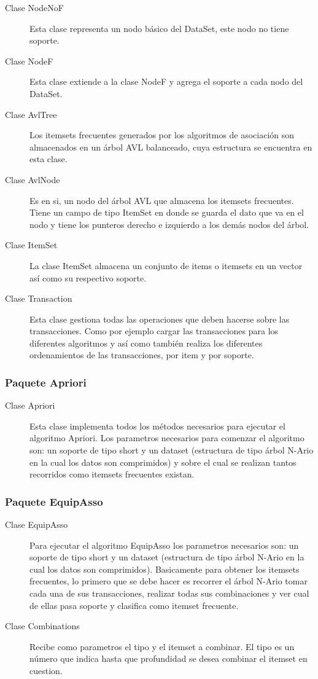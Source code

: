 \begin{description}
\item [Clase NodeNoF] Esta clase representa un nodo b\'asico del DataSet, este nodo no tiene soporte.
\item [Clase NodeF] Esta clase extiende a la clase NodeF y agrega el soporte a cada nodo del DataSet.
\item [Clase AvlTree] Los itemsets frecuentes generados por los algoritmos de asociaci\'on son
almacenados en un \'arbol AVL balanceado, cuya estructura se encuentra en esta clase.
\item [Clase AvlNode] Es en si, un nodo del \'arbol AVL que almacena los itemsets frecuentes. Tiene un
campo de tipo ItemSet en donde se guarda el dato que va en el nodo y tiene los punteros derecho e 
izquierdo a los dem\'as nodos del \'arbol.
\item [Clase ItemSet] La clase ItemSet almacena un conjunto de items o itemsets en un vector as\'i como
su respectivo soporte.
\item [Clase Transaction] Esta clase gestiona todas las operaciones que deben hacerse sobre las
transacciones. Como por ejemplo cargar las transacciones para los diferentes algoritmos y as\'i como 
tambi\'en realiza los diferentes ordenamientos de las transacciones, por item y por soporte.
\end{description}

\subsubsection{Paquete Apriori}
\begin{description}
\item [Clase Apriori] Esta clase implementa todos los m\'etodos necesarios para ejecutar el algoritmo Apriori. Los
parametros necesarios para comenzar el algoritmo son: un soporte de tipo short y un dataset (estructura de tipo
\'arbol N-Ario en la cual los datos son comprimidos) y sobre el cual se realizan tantos recorridos como itemsets
frecuentes existan.
\end{description}

\subsubsection{Paquete EquipAsso}
\begin{description}
\item [Clase EquipAsso] Para ejecutar el algoritmo EquipAsso los parametros necesarios son: un soporte de tipo
short y un dataset (estructura de tipo \'arbol N-Ario en la cual los datos son comprimidos). Basicamente para
obtener los itemsets frecuentes, lo primero que se debe hacer es recorrer el \'arbol N-Ario tomar cada una de
sus transacciones, realizar todas sus combinaciones y ver cual de ellas pasa soporte y clasifica como itemset
frecuente.
\item [Clase Combinations] Recibe como parametros el tipo y el itemset a combinar. El tipo es un n\'umero que
indica hasta que profundidad se desea combinar el itemset en cuestion.
\end{description}


